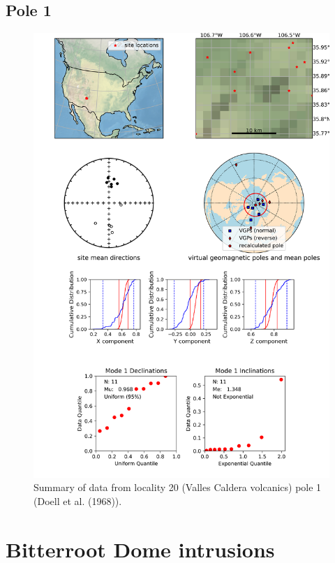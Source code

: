 \documentclass{article}
\begin{document}
\subsection{Pole 1}


\begin{figure}[H]
\centering
\includegraphics[width=5 in]{./20/1/pole_summary.png}
\caption{Summary of data from locality 20 (Valles Caldera volcanics) pole 1 (Doell et al. (1968)).}
\end{figure}

\section{Bitterroot Dome intrusions}
\end{document}
